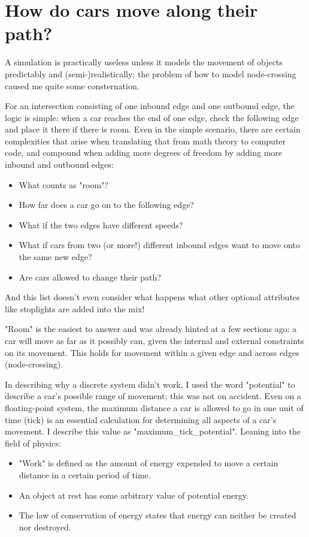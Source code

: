 \section{How do cars move along their path?}

\par A simulation is practically useless unless it models the movement of objects predictably and (semi-)realistically; the problem of how to model node-crossing caused me quite some consternation. \\

\par  For an intersection consisting of one inbound edge and one outbound edge, the logic is simple:  when a car reaches the end of one edge, check the following edge and place it there if there is room.  Even in the simple scenario, there are certain complexities that arise when translating that from math theory to computer code, and compound when adding more degrees of freedom by adding more inbound and outbound edges: 

\begin{itemize}
    \item What counts as "room"?
    \item How far does a car go on to the following edge?
    \item What if the two edges have different speeds?
    \item What if cars from two (or more!) different inbound edges want to move onto the same new edge?
    \item Are cars allowed to change their path?
\end{itemize}

\noindent And this list doesn't even consider what happens what other optional attributes like stoplights are added into the mix!\\

\par "Room" is the easiest to answer and was already hinted at a few sections ago:  a car will move as far as it possibly can, given the internal and external constraints on its movement.  This holds for movement within a given edge and across edges (node-crossing).  \\

\par In describing why a discrete system didn't work, I used the word "potential" to describe a car's possible range of movement; this was not on accident.  Even on a floating-point system, the maximum distance a car is allowed to go in one unit of time (tick) is an essential calculation for determining all aspects of a car's movement.  I describe this value as "maximum\_tick\_potential".  Leaning into the field of physics:
\begin{itemize}
    \item "Work" is defined as the amount of energy expended to move a certain distance in a certain period of time.
    \item An object at rest has some arbitrary value of potential energy.  
    \item The law of conservation of energy states that energy can neither be created nor destroyed.
\end{itemize}

